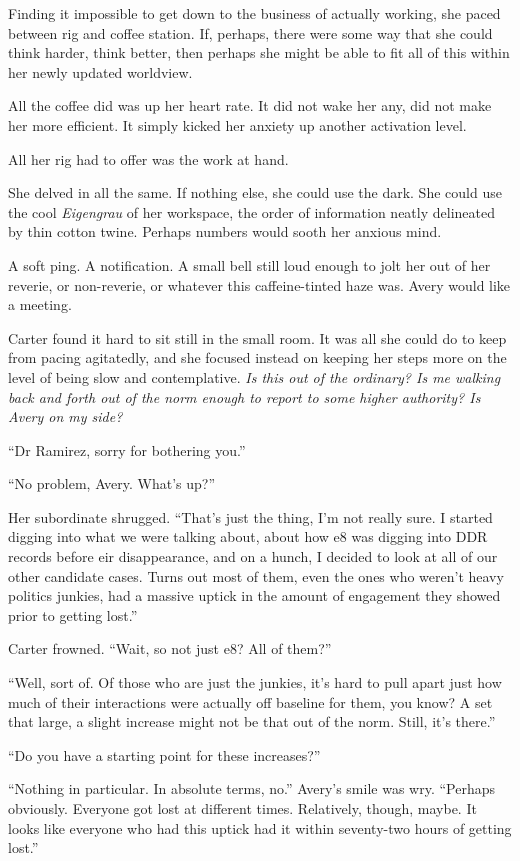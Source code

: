 Finding it impossible to get down to the business of actually working, she paced between rig and coffee station. If, perhaps, there were some way that she could think harder, think better, then perhaps she might be able to fit all of this within her newly updated worldview.

All the coffee did was up her heart rate. It did not wake her any, did not make her more efficient. It simply kicked her anxiety up another activation level.

All her rig had to offer was the work at hand.

She delved in all the same. If nothing else, she could use the dark. She could use the cool \emph{Eigengrau} of her workspace, the order of information neatly delineated by thin cotton twine. Perhaps numbers would sooth her anxious mind.

A soft ping. A notification. A small bell still loud enough to jolt her out of her reverie, or non-reverie, or whatever this caffeine-tinted haze was. Avery would like a meeting.

Carter found it hard to sit still in the small room. It was all she could do to keep from pacing agitatedly, and she focused instead on keeping her steps more on the level of being slow and contemplative. \emph{Is this out of the ordinary? Is me walking back and forth out of the norm enough to report to some higher authority? Is Avery on my side?}

``Dr Ramirez, sorry for bothering you.''

``No problem, Avery. What's up?''

Her subordinate shrugged. ``That's just the thing, I'm not really sure. I started digging into what we were talking about, about how e8 was digging into DDR records before eir disappearance, and on a hunch, I decided to look at all of our other candidate cases. Turns out most of them, even the ones who weren't heavy politics junkies, had a massive uptick in the amount of engagement they showed prior to getting lost.''

Carter frowned. ``Wait, so not just e8? All of them?''

``Well, sort of. Of those who are just the junkies, it's hard to pull apart just how much of their interactions were actually off baseline for them, you know? A set that large, a slight increase might not be that out of the norm. Still, it's there.''

``Do you have a starting point for these increases?''

``Nothing in particular. In absolute terms, no.'' Avery's smile was wry. ``Perhaps obviously. Everyone got lost at different times. Relatively, though, maybe. It looks like everyone who had this uptick had it within seventy-two hours of getting lost.''

